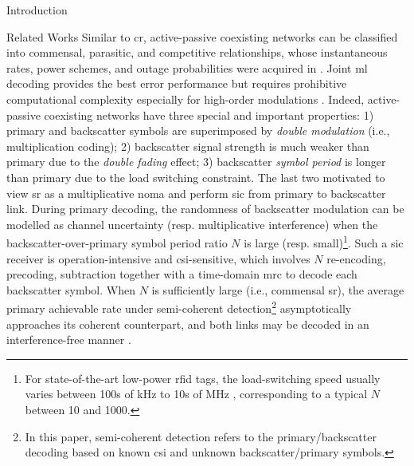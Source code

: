 \documentclass[journal]{IEEEtran}
\begin{document}
\begin{section}{Introduction}
	\begin{subsection}{Related Works}
		Similar to \gls{cr}, active-passive coexisting networks can be classified into commensal, parasitic, and competitive relationships, whose instantaneous rates, power schemes, and outage probabilities were acquired in \cite{Guo2019b,Ding2020}.
		Joint \gls{ml} decoding provides the best error performance but requires prohibitive computational complexity especially for high-order modulations \cite{Yang2018}.
		Indeed, active-passive coexisting networks have three special and important properties:
		1) primary and backscatter symbols are superimposed by \emph{double modulation} (i.e., multiplication coding);
		2) backscatter signal strength is much weaker than primary due to the \emph{double fading} effect;
		3) backscatter \emph{symbol period} is longer than primary due to the load switching constraint.
		The last two motivated \cite{Long2020a,Liang2020,Guo2019b,Ding2020,Zhou2019a,Wu2021a,Xu2021a,Yang2021a,Yang2018,Han2021,Zhang2022} to view \gls{sr} as a multiplicative \gls{noma} and perform \gls{sic} from primary to backscatter link.
		During primary decoding, the randomness of backscatter modulation can be modelled as channel uncertainty (resp. multiplicative interference) when the backscatter-over-primary symbol period ratio $N$ is large (resp. small)\footnote{For state-of-the-art low-power \gls{rfid} tags, the load-switching speed usually varies between \num{100}s of \unit{\kHz} to \num{10}s of \unit{\MHz} \cite{Torres2021}, corresponding to a typical $N$ between \num{10} and \num{1000}.}.
		Such a \gls{sic} receiver is operation-intensive and \gls{csi}-sensitive, which involves $N$ re-encoding, precoding, subtraction together with a time-domain \gls{mrc} to decode each backscatter symbol.
		When $N$ is sufficiently large (i.e., commensal \gls{sr}), the average primary achievable rate under semi-coherent detection\footnote{In this paper, semi-coherent detection refers to the primary/backscatter decoding based on known \gls{csi} and unknown backscatter/primary symbols.} asymptotically approaches its coherent counterpart, and both links may be decoded in an interference-free manner \cite{Long2020a}.

\end{subsection}
\end{section}
\end{document}

